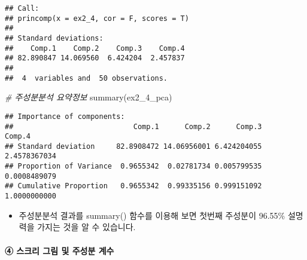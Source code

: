 \documentclass[
]{article}
\newenvironment{Shaded}{\begin{snugshade}}{\end{snugshade}}
\newcommand{\CommentTok}[1]{\textcolor[rgb]{0.56,0.35,0.01}{\textit{#1}}}
\newcommand{\FunctionTok}[1]{\textcolor[rgb]{0.00,0.00,0.00}{#1}}
\newcommand{\NormalTok}[1]{#1}
\providecommand{\tightlist}{%
  \setlength{\itemsep}{0pt}\setlength{\parskip}{0pt}}
\begin{document}
\begin{verbatim}
## Call:
## princomp(x = ex2_4, cor = F, scores = T)
## 
## Standard deviations:
##    Comp.1    Comp.2    Comp.3    Comp.4 
## 82.890847 14.069560  6.424204  2.457837 
## 
##  4  variables and  50 observations.
\end{verbatim}

\begin{Shaded}
\begin{Highlighting}[]
\CommentTok{\# 주성분분석 요약정보}
\FunctionTok{summary}\NormalTok{(ex2\_4\_pca)}
\end{Highlighting}
\end{Shaded}

\begin{verbatim}
## Importance of components:
##                            Comp.1      Comp.2      Comp.3       Comp.4
## Standard deviation     82.8908472 14.06956001 6.424204055 2.4578367034
## Proportion of Variance  0.9655342  0.02781734 0.005799535 0.0008489079
## Cumulative Proportion   0.9655342  0.99335156 0.999151092 1.0000000000
\end{verbatim}

\begin{itemize}
\tightlist
\item
  주성분분석 결과를 summary() 함수를 이용해 보면 첫번째 주성분이 96.55\%
  설명력을 가지는 것을 알 수 있습니다.
\end{itemize}

\hypertarget{uxc2a4uxd06cuxb9ac-uxadf8uxb9bc-uxbc0f-uxc8fcuxc131uxbd84-uxacc4uxc218}{%
\paragraph{④ 스크리 그림 및 주성분
계수}\label{uxc2a4uxd06cuxb9ac-uxadf8uxb9bc-uxbc0f-uxc8fcuxc131uxbd84-uxacc4uxc218}}
\end{document}
